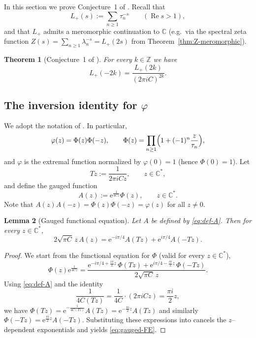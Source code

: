 \documentclass[11pt,letterpaper]{amsart}
\numberwithin{equation}{section}
\newtheorem{theorem}{Theorem}[section]
\newtheorem{lemma}[theorem]{Lemma}
\theoremstyle{definition}
\newcommand{\C}{\mathbb{C}}
\newcommand{\Z}{\mathbb{Z}}
\newcommand{\Ree}{\operatorname{Re}}
\newcommand{\e}{\mathrm{e}}
\begin{document}
In this section we prove Conjecture~1 of \cite{BOCRS}. Recall that
\[
L_+(s):=\sum_{n\ge1}\tau_n^{-s}\qquad(\Ree s>1),
\]
and that $L_+$ admits a meromorphic continuation to $\C$ (e.g.\ via the spectral zeta function $Z(s)=\sum_{n\ge1}\lambda_n^{-s}=L_+(2s)$ from Theorem~\ref{thm:Z-meromorphic}).

\begin{theorem}[Conjecture~1 of \cite{BOCRS}]\label{thm:conj1}
For every $k\in\Z$ we have
\[
L_+(-2k)=\frac{L_+(2k)}{(2\pi i C)^{2k}}.
\]
\end{theorem}

\subsection{The inversion identity for $\varphi$}

We adopt the notation of \cite{BOCRS}. In particular,
\[
\varphi(z)=\Phi(z)\Phi(-z),\qquad
\Phi(z)=\prod_{n\ge1}\Bigl(1+(-1)^n\frac{z}{\tau_n}\Bigr),
\]
and $\varphi$ is the extremal function normalized by $\varphi(0)=1$ (hence $\Phi(0)=1$).
Let
\begin{equation}\label{eq:def-T}
Tz:=\frac{1}{2\pi i C z},\qquad z\in\C^\ast,
\end{equation}
and define the gauged function
\begin{equation}\label{eq:def-A}
A(z):=\e^{\frac{1}{4Cz}}\Phi(z),\qquad z\in\C^\ast.
\end{equation}
Note that $A(z)A(-z)=\Phi(z)\Phi(-z)=\varphi(z)$ for all $z\neq 0$.

\begin{lemma}[Gauged functional equation]\label{lem:gauged-FE}
Let $A$ be defined by \eqref{eq:def-A}. Then for every $z\in\C^\ast$,
\begin{equation}\label{eq:gauged-FE}
2\sqrt{\pi C}\,z\,A(z)=\e^{-i\pi/4}A(Tz)+\e^{i\pi/4}A(-Tz).
\end{equation}
\end{lemma}

\begin{proof}
We start from the functional equation \cite[(1.6)]{BOCRS} for $\Phi$ (valid for every $z\in\C^\ast$),
\[
\Phi(z)\e^{\frac{1}{4Cz}}
=
\frac{
\e^{-i\pi/4+\frac{i\pi}{2}z}\,\Phi(Tz)
+
\e^{i\pi/4-\frac{i\pi}{2}z}\,\Phi(-Tz)
}{2\sqrt{\pi C}\,z}.
\]
Using \eqref{eq:def-A} and the identity
\[
\frac{1}{4C(Tz)}=\frac{1}{4C}\cdot (2\pi i C z)=\frac{\pi i}{2}z,
\]
we have $\Phi(Tz)=\e^{-\frac{1}{4C(Tz)}}A(Tz)=\e^{-\frac{\pi i}{2}z}A(Tz)$ and similarly
$\Phi(-Tz)=\e^{\frac{\pi i}{2}z}A(-Tz)$. Substituting these expressions into \cite[(1.6)]{BOCRS}
cancels the $z$--dependent exponentials and yields \eqref{eq:gauged-FE}.
\end{proof}
\end{document}
